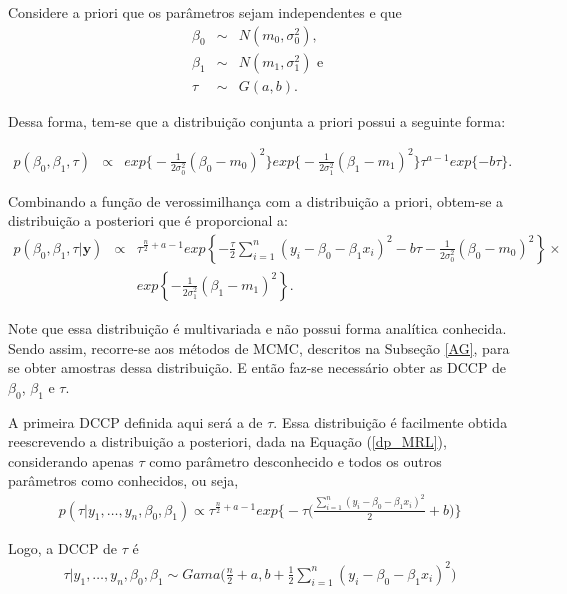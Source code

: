 \documentclass[12pt,a4paper,header]{abnt}
\def\bs{\boldsymbol}
\begin{document}
Considere a priori que os parâmetros sejam independentes e que
\begin{eqnarray}
\beta_0 &\sim& N(m_0,\sigma_0^2), \nonumber \\
\beta_1 &\sim& N(m_1,\sigma_1^2) \mbox{ e } \nonumber \\
\tau &\sim& G(a,b). \nonumber
\end{eqnarray}

Dessa forma, tem-se que a distribuição conjunta a priori possui a seguinte forma:

\begin{eqnarray}
 p(\beta_0, \beta_1 , \tau) &\propto& exp\Big\{-\frac{1}{2\sigma_0^2}( \beta_0 - m_0)^2\Big\} exp\Big\{-\frac{1}{2\sigma_1^2}( \beta_1 - m_1)^2\Big\} \tau^{a-1}exp \{-b \tau\}.
\end{eqnarray}

Combinando a função de verossimilhança com a distribuição a priori, obtem-se a distribuição a posteriori que é proporcional a:
\begin{eqnarray}
p(\beta_0, \beta_1 , \tau|\bs{y}) &\propto& \tau^{\frac{n}{2}+a-1} exp \left\{ -\frac{\tau}{2} \sum^n_{i=1} (y_i - \beta_0 - \beta_1 x_i)^2 - b\tau  - \frac{1}{2\sigma_0^2}(\beta_0-m_0)^2  \right\} \times \nonumber \\
&& exp\left\{- \frac{1}{2\sigma_1^2}(\beta_1-m_1)^2  \right\} . \label{dp_MRL}
\end{eqnarray}

Note que essa distribuição é multivariada e não possui forma analítica conhecida. Sendo assim, recorre-se aos métodos de \ac{MCMC}, descritos na Subseção \ref{AG}, para se obter amostras dessa distribuição. E então faz-se necessário obter as \ac{DCCP} de $\beta_0$, $\beta_1$ e $\tau$.

A primeira \ac{DCCP} definida aqui será a de $\tau$. Essa distribuição é facilmente obtida reescrevendo a distribuição a posteriori, dada na Equação (\ref{dp_MRL}), considerando apenas $\tau$ como parâmetro desconhecido e todos os outros parâmetros como conhecidos, ou seja,
\begin{eqnarray}
p(\tau | y_1, \ldots, y_n, \beta_0, \beta_1) \propto \tau^{\frac{n}{2}+a-1}exp\Big\{-\tau \Big( \frac{\sum^n_{i=1}(y_i-\beta_0-\beta_1 x_i)^2}{2} + b \Big) \Big\}
\end{eqnarray}

Logo, a \ac{DCCP} de $\tau$ é
\begin{eqnarray}
\tau|y_1, \ldots,y_n,\beta_0, \beta_1 \sim Gama \Big( \frac{n}{2}+a,b+\frac{1}{2} \sum^n_{i=1}(y_i-\beta_0-\beta_1 x_i)^2 \Big)
\end{eqnarray}
\end{document}
